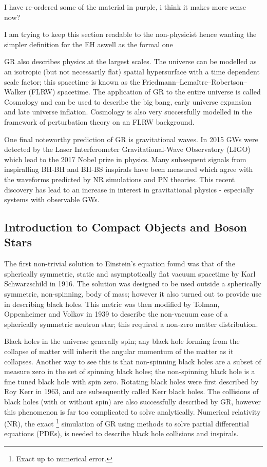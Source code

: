 \color{choral} I have re-ordered some of the material in purple, i think it makes more sense now?

I am trying to keep this section readable to the non-physicist hence wanting the simpler definition for the EH aswell as the formal one
\color{black}

GR also describes physics at the largest scales. The universe can be modelled as an isotropic (but not necessarily flat) spatial hypersurface with a time dependent scale factor; this spacetime is known as the Friedmann–Lemaître–Robertson–Walker (FLRW) spacetime. The application of GR to the entire universe is called Cosmology and can be used to describe the big bang, early universe expansion and late universe inflation. Cosmology is also very successfully modelled in the framework of perturbation theory on an FLRW background.

One final noteworthy prediction of GR is gravitational waves. In 2015 GWs were detected by the Laser Interferometer Gravitational-Wave Observatory (LIGO) which lead to the 2017 Nobel prize in physics. Many subsequent signals from inspiralling BH-BH and BH-BS inspirals have been measured which agree with the waveforms predicted by NR simulations and PN theories. This recent discovery has lead to an increase in interest in gravitational physics - especially systems with observable GWs.



\subsection{Introduction to Compact Objects and Boson Stars}
The first non-trivial solution to Einstein's equation found was that of the spherically symmetric, static and asymptotically flat vacuum spacetime by Karl Schwarzschild in 1916. The solution was designed to be used outside a spherically symmetric, non-spinning, body of mass; however it also turned out to provide use in describing black holes. This metric was then modified by Tolman, Oppenheimer and Volkov in 1939 to describe the non-vacuum case of a spherically symmetric neutron star; this required a non-zero matter distribution.

Black holes in the universe generally spin; any black hole forming from the collapse of matter will inherit the angular momentum of the matter as it collapses. Another way to see this is that non-spinning black holes are a subset of measure zero in the set of spinning black holes; the non-spinning black hole is a fine tuned black hole with spin zero. Rotating black holes were first described by Roy Kerr in 1963, and are subsequently called Kerr black holes. The collisions of black holes (with or without spin) {\color{orchid} are} also successfully described by GR, however this phenomenon is far too complicated to solve analytically. Numerical relativity (NR), the exact{ \color{orchid} \footnote{\color{orchid} Exact up to numerical error.} } simulation of GR using methods to solve partial differential equations (PDEs), is needed to describe black hole collisions and inspirals.


